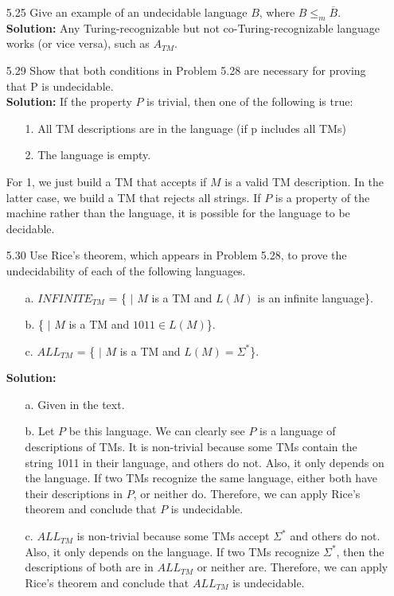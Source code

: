 \begin{enumerate}
\item[5.25]Give an example of an undecidable language $B$, where $B \le_{m} \overline{B}$.
\\
\textbf{Solution:} Any Turing-recognizable but not co-Turing-recognizable language works (or vice versa), such as $A_{TM}$.

\item[5.29]Show that both conditions in Problem 5.28 are necessary for proving that P is undecidable.
\\
\textbf{Solution:} If the property $P$ is trivial, then one of the following is true:
\begin{enumerate}
\item[1.]All TM descriptions are in the language (if p includes all TMs)
\item[2.]The language is empty. 
\end{enumerate}
For 1, we just build a TM that accepts if $M$ is a valid TM description. In the latter case, we build a TM that rejects all strings. If $P$ is a property of the machine rather than the language, it is possible for the language to be decidable.

\item[5.30]Use Rice's theorem, which appears in Problem 5.28, to prove the undecidability of each of the following languages.
\begin{enumerate}
\item[a.]$INFINITE_{TM}$ = \{ $|$ $M$ is a TM and $L(M)$ is an infinite language\}.
\item[b.]\{ $|$ $M$ is a TM and $1011 \in L(M)$\}.
\item[c.]$ALL_{TM}$ = \{ $|$ $M$ is a TM and $L(M) = \Sigma^*$\}.
\end{enumerate}
\textbf{Solution:}
\begin{enumerate}
\item[a.]Given in the text.
\item[b.]Let $P$ be this language. We can clearly see $P$ is a language of descriptions of TMs. It is non-trivial because some TMs contain the string 1011 in their language, and others do not. Also, it only depends on the language. If two TMs recognize the same language, either both have their descriptions in $P$, or neither do. Therefore, we can apply Rice's theorem and conclude that $P$ is undecidable.
\item[c.]$ALL_{TM}$ is non-trivial because some TMs accept $\Sigma^*$ and others do not. Also, it only depends on the language. If two TMs recognize $\Sigma^*$, then the descriptions of both are in $ALL_{TM}$ or neither are. Therefore, we can apply Rice's theorem and conclude that $ALL_{TM}$ is undecidable.
\end{enumerate}
\end{enumerate}